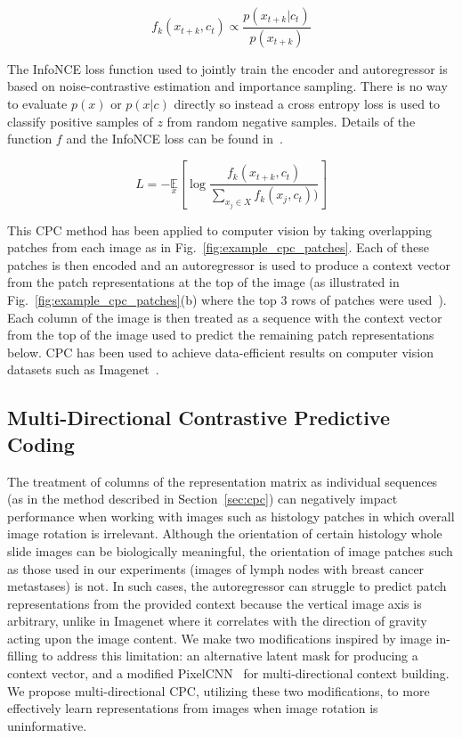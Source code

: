 \begin{equation}
	f_k(x_{t+k}, c_t) \propto \frac{p(x_{t+k}|c_t)}{p(x_{t+k})}
	\label{eq:density_ratio}
\end{equation}

The InfoNCE loss function used to jointly train the encoder and autoregressor is based on noise-contrastive estimation and importance sampling. There is no way to evaluate \(p(x)\) or \(p(x|c)\) directly so instead a cross entropy loss is used to classify positive samples of \(z\) from random negative samples. Details of the function \(f\) and the InfoNCE loss can be found in~\cite{oord2018representation}.

\begin{equation}
	L=-\underset{x}{\mathbb{E}}\left[\log\frac{f_k(x_{t+k},c_t)}{\sum_{x_j\in X}f_k(x_j,c_t))}\right]
	\label{eq:InfoNCE}
\end{equation} 

This CPC method has been applied to computer vision by taking overlapping patches from each image as in Fig.~\ref{fig:example_cpc_patches}. Each of these patches is then encoded and an autoregressor is used to produce a context vector from the patch representations at the top of the image (as illustrated in Fig.~\ref{fig:example_cpc_patches}(b) where the top 3 rows of patches were used~\cite{oord2018representation}). Each column of the image is then treated as a sequence with the context vector from the top of the image used to predict the remaining patch representations below. CPC has been used to achieve data-efficient results on computer vision datasets such as Imagenet~\cite{deng2009imagenet}.

\subsection{Multi-Directional Contrastive Predictive Coding}
The treatment of columns of the representation matrix as individual sequences (as in the method described in Section~\ref{sec:cpc}) can negatively impact performance when working with images such as histology patches in which overall image rotation is irrelevant. Although the orientation of certain histology whole slide images can be biologically meaningful, the orientation of image patches such as those used in our experiments (images of lymph nodes with breast cancer metastases) is not. In such cases, the autoregressor can struggle to predict patch representations from the provided context because the vertical image axis is arbitrary, unlike in Imagenet where it correlates with the direction of gravity acting upon the image content. We make two modifications inspired by image in-filling to address this limitation: an alternative latent mask for producing a context vector, and a modified PixelCNN~\cite{oord2016pixel} for multi-directional context building. We propose multi-directional CPC, utilizing these two modifications, to more effectively learn representations from images when image rotation is uninformative.

